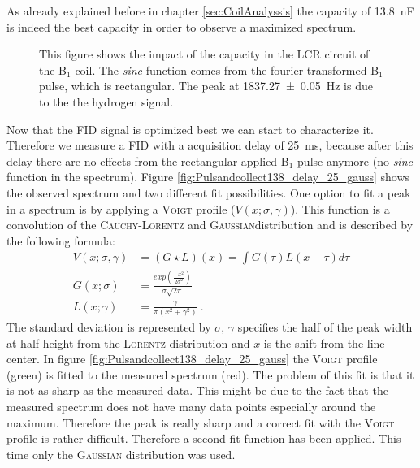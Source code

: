 As already explained before in chapter \ref{sec:CoilAnalyssis} the capacity of \SI{13.8}{\nano \farad} is indeed the best capacity in order to observe a maximized spectrum.
\begin{figure}[H]
    \centering
    
    \caption[This figure shows the impact of the capacity in the LCR circuit of the B$_1$ coil.]{This figure shows the impact of the capacity in the LCR circuit of the B$_1$ coil.
    The \textit{sinc} function comes from the fourier transformed B$_1$ pulse, which is rectangular.
    The peak at \SI{1837.27 \pm 0.05}{\hertz} is due to the the hydrogen signal.}
    \label{fig:Pulsandcollect}
\end{figure}
Now that the FID signal is optimized best we can start to characterize it.
Therefore we measure a FID with a acquisition delay of \SI{25}{\milli \second}, because after this delay there are no effects from the rectangular applied B$_1$ pulse anymore (no \textit{sinc} function in the spectrum).
Figure \ref{fig:Pulsandcollect138_delay_25_gauss} shows the observed spectrum and two different fit possibilities.\newline
One option to fit a peak in a spectrum is by applying a \textsc{Voigt} profile ($V(x;\sigma , \gamma)$).
This function is a convolution of the \textsc{Cauchy-Lorentz} and \textsc{Gaussian}distribution and is described by the following formula:
\begin{align}
    V(x;\sigma , \gamma) &= ( G \star L)(x) = \int G(\tau) L(x-\tau) d\tau \\
    G(x;\sigma) &= \frac{exp\left(\frac{-x^2}{2\sigma^2}\right)}{\sigma \sqrt{2 \pi}} \\
    L(x;\gamma)  &= \frac{\gamma}{\pi \left( x^2+\gamma^2\right)} \ .
    \label{eq: voigt} 
\end{align}
The standard deviation is represented by $\sigma$, $\gamma$ specifies the half of the peak width at half height from the \textsc{Lorentz} distribution and $x$ is the shift from the line center.
In figure \ref{fig:Pulsandcollect138_delay_25_gauss} the \textsc{Voigt} profile (green) is fitted to the measured spectrum (red).
The problem of this fit is that it is not as sharp as the measured data.
This might be due to the fact that the measured spectrum does not have many data points especially around the maximum.
Therefore the peak is really sharp and a correct fit with the \textsc{Voigt} profile is rather difficult.
Therefore a second fit function has been applied.
This time only the \textsc{Gaussian} distribution was used.
